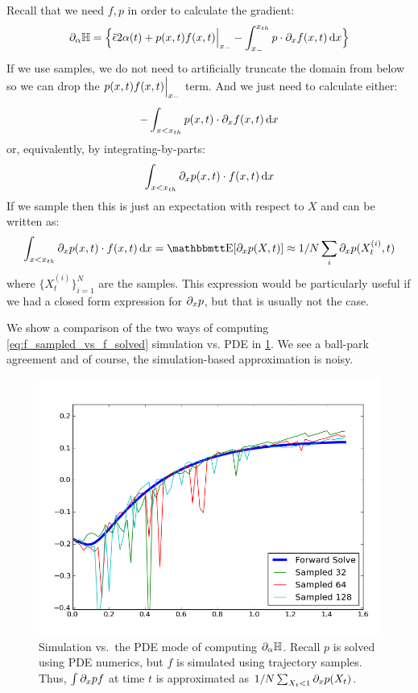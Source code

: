 \documentclass{article}
\begin{document}
Recall that we need $f,p$ in order to calculate the gradient:
$${\partial}_{\alpha} { \mathbb{H}} =  \Big\{
 \tilde{{\epsilon}}  2 {\alpha}(t)
+ p(x,t) f(x,t) \Big|_{ x_{-} }
- \int _{ x_{-} }^{ x_{th} } p \cdot {\partial}_x f(x,t) \, \mathrm{d} x 
\Big\}
$$
If we use samples, we do not need to artificially truncate the domain from below
so we can drop the $p(x,t) f(x,t) \Big|_{ x_{-} }$ term. And we just need to
calculate either:
$$ - \int_{x < { x_{th} }} p(x,t) \cdot {\partial}_x f(x,t) \, \mathrm{d} x$$
or, equivalently, by integrating-by-parts:
$$   \int_{x < { x_{th} }} {\partial}_x p(x,t) \cdot f(x,t) \, \mathrm{d} x$$
If we sample then this is just an expectation with respect to $X$ and can be
written as: 
\begin{equation}
\int_{x < \xth} \di_x p(x,t) \cdot f(x,t) \intd{x} = \Exp[\di_x p(X,t) ]
\approx 1/N\sum_i \di_x p(X^{(i)}_t,t) 
\label{eq:f_sampled_vs_f_solved}
\end{equation}   
where $\{ X^{(i)}_t \}_{i=1}^N$ are the samples. This expression would be
particularly useful if we had a closed form expression for ${\partial}_x p$, but that
is usually not the case.

We show a comparison of the two ways of computing
\cref{eq:f_sampled_vs_f_solved} simulation vs. PDE in
\cref{fig:f_sampled_vs_f_solved}. We see a ball-park agreement and of course,
the simulation-based approximation is noisy.
\begin{figure}[htp]
\begin{center}
  \includegraphics[width=.9\textwidth]{Figs/FeynmanKac/fsampled_psolved_t=8_b=12.png}
  \caption{Simulation vs.\ the PDE mode of computing ${\partial}_{\alpha} { \mathbb{H}}$.
  Recall $p$ is solved using PDE numerics, but $f$ is simulated using trajectory
  samples. Thus, $\int {\partial}_x p f $ at time $t$ is approximated as $1/N
  \sum_{X_t < 1} {\partial}_x p(X_t)$.}
  \label{fig:f_sampled_vs_f_solved}
\end{center}
\end{figure}
\end{document}
